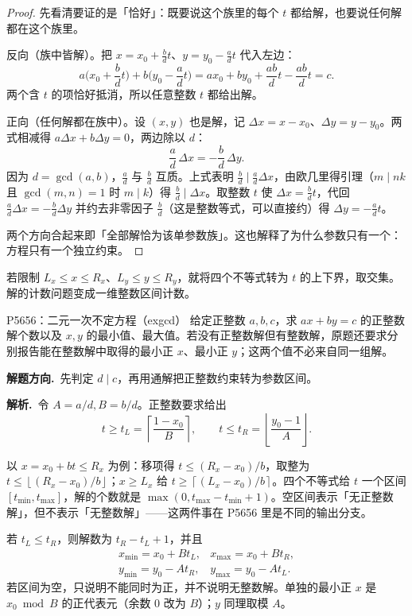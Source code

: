 \documentclass[UTF8,a4paper,11pt,twoside,openright,fontset=fandol]{ctexbook}
\theoremstyle{definition}
\newcommand{\floor}[1]{\left\lfloor #1\right\rfloor}
\newcommand{\ceil}[1]{\left\lceil #1\right\rceil}
\newcommand{\sol}{\par\noindent\textbf{解析.}\ }
\newcommand{\hint}{\par\noindent\textbf{解题方向.}\ }
\begin{document}
\begin{proof}
先看清要证的是「恰好」：既要说这个族里的每个 $t$ 都给解，也要说任何解都在这个族里。

反向（族中皆解）。把 $x=x_0+\frac bd t$、$y=y_0-\frac ad t$ 代入左边：
\[
 a\Big(x_0+\frac bd t\Big)+b\Big(y_0-\frac ad t\Big)=ax_0+by_0+\frac{ab}{d}t-\frac{ab}{d}t=c.
\]
两个含 $t$ 的项恰好抵消，所以任意整数 $t$ 都给出解。

正向（任何解都在族中）。设 $(x,y)$ 也是解，记 $\Delta x=x-x_0$、$\Delta y=y-y_0$。两式相减得 $a\Delta x+b\Delta y=0$，两边除以 $d$：
\[
 \frac ad\,\Delta x=-\frac bd\,\Delta y.
\]
因为 $d=\gcd(a,b)$，$\frac ad$ 与 $\frac bd$ 互质。上式表明 $\frac bd\mid\frac ad\Delta x$，由欧几里得引理（$m\mid nk$ 且 $\gcd(m,n)=1$ 时 $m\mid k$）得 $\frac bd\mid\Delta x$。取整数 $t$ 使 $\Delta x=\frac bd t$，代回 $\frac ad\Delta x=-\frac bd\Delta y$ 并约去非零因子 $\frac bd$（这是整数等式，可以直接约）得 $\Delta y=-\frac ad t$。

两个方向合起来即「全部解恰为该单参数族」。这也解释了为什么参数只有一个：方程只有一个独立约束。
\end{proof}
若限制 $L_x\le x\le R_x$、$L_y\le y\le R_y$，就将四个不等式转为 $t$ 的上下界，取交集。解的计数问题变成一维整数区间计数。

\begin{problem}{P5656：二元一次不定方程（exgcd）}
给定正整数 $a,b,c$，求 $ax+by=c$ 的正整数解个数以及 $x,y$ 的最小值、最大值。若没有正整数解但有整数解，原题还要求分别报告能在整数解中取得的最小正 $x$、最小正 $y$；这两个值不必来自同一组解。
\end{problem}
\hint 先判定 $d\mid c$，再用通解把正整数约束转为参数区间。

\sol 令 $A=a/d,B=b/d$。正整数要求给出
\[
 t\ge t_L=\ceil{\frac{1-x_0}{B}},\qquad
 t\le t_R=\floor{\frac{y_0-1}{A}}.
\]

\begin{tip}
以 $x=x_0+bt\le R_x$ 为例：移项得 $t\le(R_x-x_0)/b$，取整为 $t\le\floor{(R_x-x_0)/b}$；$x\ge L_x$ 给 $t\ge\ceil{(L_x-x_0)/b}$。四个不等式给 $t$ 一个区间 $[t_{\min},t_{\max}]$，解的个数就是 $\max(0,t_{\max}-t_{\min}+1)$。空区间表示「无正整数解」，但不表示「无整数解」——这两件事在 P5656 里是不同的输出分支。
\end{tip}

若 $t_L\le t_R$，则解数为 $t_R-t_L+1$，并且
\[
\begin{array}{ll}
x_{\min}=x_0+Bt_L,&x_{\max}=x_0+Bt_R,\\
y_{\min}=y_0-At_R,&y_{\max}=y_0-At_L.
\end{array}
\]
若区间为空，只说明不能同时为正，并不说明无整数解。单独的最小正 $x$ 是 $x_0\bmod B$ 的正代表元（余数 $0$ 改为 $B$）；$y$ 同理取模 $A$。
\end{document}
